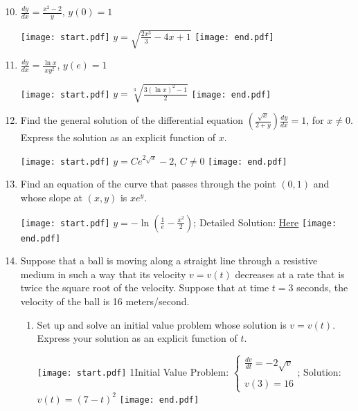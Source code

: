 \documentclass[12pt]{article}
\begin{document}

\begin{enumerate}
\setcounter{enumi}{9}

\item $\frac{dy}{dx}=\frac{x^2-2}{y}$, $y(0)=1$

\texttt{[image: start.pdf]}
{{$y=\sqrt{\frac{2x^3}{3}-4x+1}$}}
\texttt{[image: end.pdf]}


\item $\frac{dy}{dx}=\frac{\ln{x}}{xy^2}$, $y(e)=1$

\texttt{[image: start.pdf]}
{{$y=\sqrt[3]{\frac{3(\ln{x})^2-1}{2}}$}}
\texttt{[image: end.pdf]}


\item Find the general solution of the differential equation $\left(\frac{\sqrt{x}}{2+y}\right)\frac{dy}{dx}=1$, for $x \neq 0$.  Express the solution as an explicit function of $x$.

\texttt{[image: start.pdf]}
{{$y=Ce^{2\sqrt{x}}-2$, $C \neq 0$}}
\texttt{[image: end.pdf]}


\item Find an equation of the curve that passes through the point $(0,1)$ and whose slope at $(x,y)$ is $xe^y$.

\texttt{[image: start.pdf]}
{{$y=-\ln{\left(\frac{1}{e}-\frac{x^2}{2}\right)}$; Detailed Solution: \textcolor{blue}{\href{http://www.math.drexel.edu/classes/Calculus/resources/Math122HW/Solutions/122_14_ODE_13.pdf}{Here}}}}
\texttt{[image: end.pdf]}



\item Suppose that a ball is moving along a straight line through a resistive medium in such a way that its velocity $v=v(t)$ decreases at a rate that is twice the square root of the velocity.  Suppose that at time $t=3$ seconds, the velocity of the ball is 16 meters/second.

\begin{enumerate}

\item Set up and solve an initial value problem whose solution is $v=v(t)$.  Express your solution as an explicit function of $t$.

\texttt{[image: start.pdf]}
{{{1\linewidth}{Initial Value Problem:
$\left\{\begin{array}{l}
\frac{dv}{dt}=-2\sqrt{v}\\
\\
v(3)=16
\end{array}\right.$; Solution:
$v(t)=(7-t)^2$}}}
\texttt{[image: end.pdf]}



\end{enumerate}
\end{enumerate}
\end{document}
